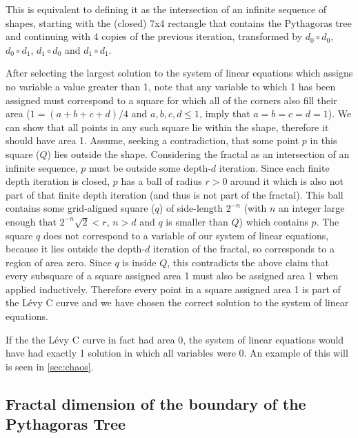 \documentclass{article}
\begin{document}
This is equivalent to defining it as the intersection of an infinite sequence of shapes, starting with the (closed) 7x4 rectangle that contains the Pythagoras tree and continuing  with 4 copies of the previous iteration, transformed by $d_0\circ d_0$, $d_0\circ d_1$, $d_1\circ d_0$ and $d_1\circ d_1$. 

After selecting the largest solution to the system of linear equations which assigns no variable a value greater than 1, note that any variable to which 1 has been assigned must correspond to a square for which all of the corners also fill their area ($1=(a+b+c+d)/4$ and $a,b,c,d\le 1$, imply that $a=b=c=d=1$). We can show that all points in any such square lie within the shape, therefore it should have area 1. Assume, seeking a contradiction, that some point $p$ in this square ($Q$) lies outside the shape. Considering the fractal as an intersection of an infinite sequence, $p$ must be outside some depth-$d$ iteration. Since each finite depth iteration is closed, $p$ has a ball of radius $r>0$ around it which is also not part of that finite depth iteration (and thus is not part of the fractal). This ball contains some grid-aligned square ($q$) of side-length $2^{-n}$ (with $n$ an integer large enough that $2^{-n}\sqrt{2}<r$, $n>d$ and $q$ is smaller than $Q$) which contains $p$. The square $q$ does not correspond to a variable of our system of linear equations, because it lies outside the depth-$d$ iteration of the fractal, so corresponds to a region of area zero. Since $q$ is inside $Q$, this contradicts the above claim that every subsquare of a square assigned area 1 must also be assigned area 1 when applied inductively. Therefore every point in a square assigned area 1 is part of the Lévy C curve and we have chosen the correct solution to the system of linear equations.

If the the Lévy C curve in fact had area 0, the system of linear equations would have had exactly 1 solution in which all variables were 0. An example of this will is seen in \ref{sec:chaos}.


\subsection{Fractal dimension of the boundary of the Pythagoras Tree}
\end{document}
